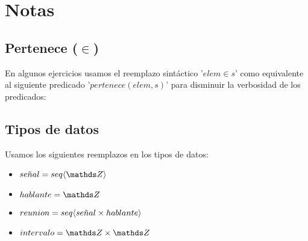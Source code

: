 \documentclass{article}
\begin{document}
\maketitle

\tableofcontents
\newpage



\section*{Notas}
\vspace{0.5cm}
\subsection*{Pertenece ($\in$)}
En algunos ejercicios usamos el reemplazo sintáctico '$elem \in s$' como equivalente
al siguiente predicado '$pertenece(elem, s)$' para disminuir la verbosidad de los predicados:
\vspace{0.5cm}
\begin{addmargin}[4em]{0em}
\end{addmargin}

\vspace{0.5cm}
\subsection*{Tipos de datos}
Usamos los siguientes reemplazos en los tipos de datos:
\begin{itemize}
	\item $se\tilde{n}al=\TLista{\ent}$
	\item $hablante=\ent$
	\item $reunion=seq \langle se\tilde{n}al \times hablante\rangle$
	\item $intervalo=\tuple{\ent}{\ent}$
\end{itemize}
\newpage
\end{document}
